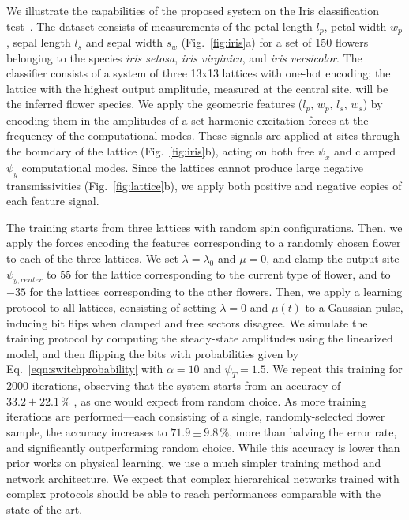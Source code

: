 We illustrate the capabilities of the proposed system on the Iris classification test~\cite{fisher1936use}. The dataset consists of measurements of the petal length $l_p$, petal width $w_p$, sepal length $l_s$ and sepal width $s_w$ (Fig.~\ref{fig:iris}a) for a set of 150 flowers belonging to the species \emph{iris setosa}, \emph{iris virginica}, and \emph{iris versicolor}. The classifier consists of a system of three 13x13 lattices with one-hot encoding; the lattice with the highest output amplitude, measured at the central site, will be the inferred flower species. We apply the geometric features ($l_p$, $w_p$, $l_s$, $w_s$) by encoding them in the amplitudes of a set  harmonic excitation forces at the frequency of the computational  modes. These signals are applied at sites through the boundary of the lattice (Fig.~\ref{fig:iris}b), acting on both free $\psi_x$ and clamped $\psi_y$ computational modes. Since the lattices cannot produce large negative transmissivities (Fig.~\ref{fig:lattice}b), we apply both positive and negative copies of each feature signal. 

The training starts from three lattices with random spin configurations. Then, we apply the forces encoding the features corresponding to a randomly chosen flower to each of the three lattices. We set $\lambda=\lambda_0$ and $\mu=0$, and clamp the output site $\psi_{y,center}$ to $55$ for the lattice corresponding to the current type of flower, and to $-35$ for the lattices corresponding to the other flowers. Then, we apply a learning protocol to all lattices, consisting of setting $\lambda=0$ and $\mu(t)$ to a Gaussian pulse, inducing bit flips when clamped and free sectors disagree. We simulate the training protocol by computing the steady-state amplitudes using the linearized model, and then flipping the bits with probabilities given by Eq.~\ref{eqn:switchprobability} with $\alpha=10$ and $\psi_T=1.5$. We repeat this training for 2000 iterations, observing that the system starts from an accuracy of $33.2 \pm 22.1\,\%$ , as one would expect from random choice. As more training iterations are performed---each consisting of a single, randomly-selected flower sample, the accuracy increases to $71.9\pm9.8\,\%$, more than halving the error rate, and significantly outperforming random choice. While this accuracy is lower than prior works on physical learning, we use a much simpler training method and network architecture. We expect that complex hierarchical networks trained with complex protocols should be able to reach performances comparable with the state-of-the-art.